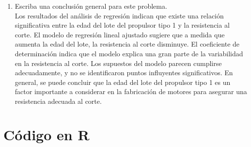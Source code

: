 \documentclass[12pt,a4paper]{article}
\begin{document}
\begin{enumerate}
  \item Escriba una conclusi\'on general para este problema.
  \\
  Los resultados del an\'alisis de regresi\'on indican que existe una relaci\'on significativa entre la edad del lote del propulsor tipo 1 y la resistencia al corte. El modelo de regresi\'on lineal ajustado sugiere que a medida que aumenta la edad del lote, la resistencia al corte disminuye. El coeficiente de determinaci\'on indica que el modelo explica una gran parte de la variabilidad en la resistencia al corte. Los supuestos del modelo parecen cumplirse adecuadamente, y no se identificaron puntos influyentes significativos. En general, se puede concluir que la edad del lote del propulsor tipo 1 es un factor importante a considerar en la fabricaci\'on de motores para asegurar una resistencia adecuada al corte.
\end{enumerate}

\newpage
\section*{C\'odigo en R}
\end{document}
